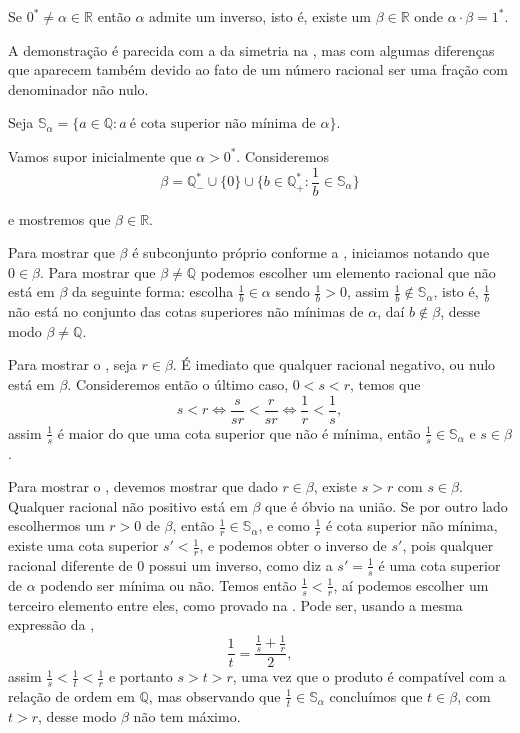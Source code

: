 \documentclass[../main.tex]{subfiles}
\begin{document}
\begin{teo}\label{reais-teo-simetricoProduto}
    Se $0^* \neq \alpha \in \mathbb{R}$ então $\alpha$ admite um inverso, isto é, existe um $\beta \in \mathbb{R}$ onde $\alpha \cdot \beta = 1^*$.
\end{teo}
\begin{dem}
    A demonstração é parecida com a da simetria na , mas com algumas diferenças que aparecem também devido ao fato de um número racional ser uma fração com denominador não nulo.

    Seja $\mathbb{S}_{\alpha} = \{a \in \mathbb{Q} : a\ \text{é cota superior não mínima de }\alpha \}$.

    Vamos supor inicialmente que $\alpha > 0^*$. Consideremos 
    \[ \beta = \mathbb{Q}_{-}^* \cup \{ 0 \} \cup 
    \{ b \in \mathbb{Q}_{+}^* : \frac{1}{b} \in \mathbb{S}_{\alpha} \} \] 

    e mostremos que $\beta \in \mathbb{R}$.
    
    Para mostrar que $\beta$ é subconjunto próprio conforme a , iniciamos notando que $0 \in \beta$. Para mostrar que $\beta \neq \mathbb{Q}$ podemos escolher um elemento racional que não está em $\beta$ da seguinte forma: escolha $\frac{1}{b} \in \alpha$ sendo $\frac{1}{b} > 0$, assim $\frac{1}{b} \not\in \mathbb{S}_{\alpha}$, isto é, $\frac{1}{b}$ não está no conjunto das cotas superiores não mínimas de $\alpha$, daí $b \not\in \beta$, desse modo $\beta \neq \mathbb{Q}$.
    
    Para mostrar o , seja $r \in \beta$. É imediato que qualquer racional negativo, ou nulo está em $\beta$. Consideremos então o último caso, $0 < s < r$, temos que 
    \[ s < r \iff \frac{s}{sr} < \frac{r}{sr} \iff \frac{1}{r} < \frac{1}{s}, \] 
    assim $\frac{1}{s}$ é maior do que uma cota superior que não é mínima, então $\frac{1}{s} \in \mathbb{S}_{\alpha}$ e $s \in \beta$.

    Para mostrar o , devemos mostrar que dado $r \in \beta$, existe $s>r$ com $s \in \beta$. Qualquer racional não positivo está em $\beta$ que é óbvio na união. Se por outro lado escolhermos um $r > 0$ de $\beta$, então $\frac{1}{r} \in \mathbb{S}_{\alpha}$, e como $\frac{1}{r}$ é cota superior não mínima, existe uma cota superior $s' < \frac{1}{r}$, e podemos obter o inverso de $s'$, pois qualquer racional diferente de $0$ possui um inverso, como diz a  $s' = \frac{1}{s}$ é uma cota superior de $\alpha$ podendo ser mínima ou não. Temos então $\frac{1}{s} < \frac{1}{r}$, aí podemos escolher um terceiro elemento entre eles, como provado na . Pode ser, usando a mesma expressão da ,
    \[ \dfrac{1}{t} = \dfrac{\frac{1}{s} + \frac{1}{r}}{2}, \]
    assim $\frac{1}{s} < \frac{1}{t} < \frac{1}{r}$  e portanto $s > t > r$, uma vez que o produto é compatível com a relação de ordem em $\mathbb{Q}$, mas observando que $\frac{1}{t} \in \mathbb{S}_{\alpha}$ concluímos que $t \in \beta$, com $t>r$, desse modo $\beta$ não tem máximo. 
\end{dem}
\end{document}
